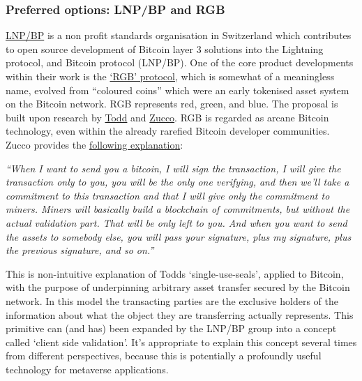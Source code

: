 \subsubsection{Preferred options: LNP/BP and RGB}
\href{https://giacomozucco.com/layers-before-bitcoin}{LNP/BP} is a non profit standards organisation in Switzerland which contributes to open source development of Bitcoin layer 3 solutions into the Lightning protocol, and Bitcoin protocol (LNP/BP). One of the core product developments within their work is the \href{https://www.rgb.tech/}{`RGB' protocol}, which is somewhat of a meaningless name, evolved from ``coloured coins'' which were an early tokenised asset system on the Bitcoin network. RGB represents red, green, and blue. The proposal is built upon research by \href{https://petertodd.org/2016/commitments-and-single-use-seals}{Todd} and \href{https://giacomozucco.com/#intro}{Zucco}. RGB is regarded as arcane Bitcoin technology, even within the already rarefied Bitcoin developer communities. Zucco provides the \href{https://bitcoinmagazine.com/culture/video-interview-giacomo-zucco-rgb-tokens-built-bitcoin}{following explanation}: \par
\textit{``When I want to send you a bitcoin, I will sign the transaction, I will give the transaction only to you, you will be the only one verifying, and then we’ll take a commitment to this transaction and that I will give only the commitment to miners. Miners will basically build a blockchain of commitments, but without the actual validation part. That will be only left to you. And when you want to send the assets to somebody else, you will pass your signature, plus my signature, plus the previous signature, and so on.''}\par
This is non-intuitive explanation of Todds `single-use-seals', applied to Bitcoin, with the purpose of underpinning arbitrary asset transfer secured by the Bitcoin network. In this model the transacting parties are the exclusive holders of the information about what the object they are transferring actually represents. This primitive can (and has) been expanded by the LNP/BP group into a concept called `client side validation'. 
It's appropriate to explain this concept several times from different perspectives, because this is potentially a profoundly useful technology for metaverse applications.\par
